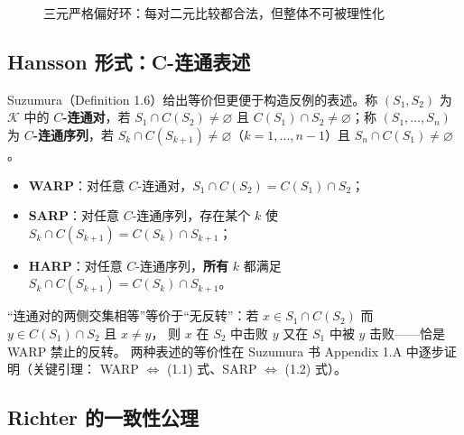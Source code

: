 \begin{figure}[H]
\centering
{}
\caption{三元严格偏好环：每对二元比较都合法，但整体不可被理性化}
\label{fig:cycle}
\end{figure}

\subsection{Hansson 形式：C-连通表述}

Suzumura（Definition 1.6）给出等价但更便于构造反例的表述。称 $(S_1,S_2)$ 为
$\mathcal{K}$ 中的 \textbf{$C$-连通对}，若 $S_1\cap C(S_2)\neq\varnothing$ 且
$C(S_1)\cap S_2\neq\varnothing$；称 $(S_1,\dots,S_n)$ 为 \textbf{$C$-连通序列}，若
$S_k\cap C(S_{k+1})\neq\varnothing$（$k=1,\dots,n-1$）且 $S_n\cap C(S_1)\neq\varnothing$。

\begin{itemize}
  \item \textbf{WARP}：对任意 $C$-连通对，$S_1\cap C(S_2)=C(S_1)\cap S_2$；
  \item \textbf{SARP}：对任意 $C$-连通序列，存在某个 $k$ 使 $S_k\cap C(S_{k+1})=C(S_k)\cap S_{k+1}$；
  \item \textbf{HARP}：对任意 $C$-连通序列，\textbf{所有} $k$ 都满足 $S_k\cap C(S_{k+1})=C(S_k)\cap S_{k+1}$。
\end{itemize}

“连通对的两侧交集相等”等价于“无反转”：若 $x\in S_1\cap C(S_2)$ 而 $y\in C(S_1)\cap S_2$ 且 $x\neq y$，
则 $x$ 在 $S_2$ 中击败 $y$ 又在 $S_1$ 中被 $y$ 击败——恰是 WARP 禁止的反转。
两种表述的等价性在 Suzumura 书 Appendix 1.A 中逐步证明（关键引理：
WARP $\iff$ (1.1) 式、SARP $\iff$ (1.2) 式）。

\subsection{Richter 的一致性公理}


